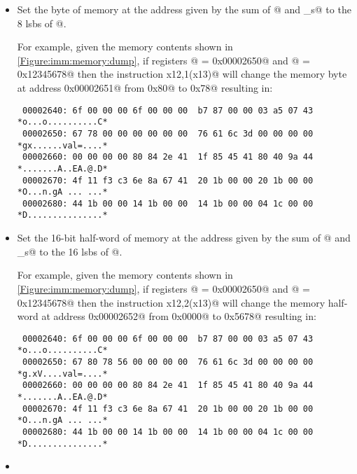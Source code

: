 \begin{itemize}
\item{}
\label{insn:sb}

Set the byte of memory at the address given by the sum of @ and 
\verb@imm_s@ to the 8 \acrshort{lsb}s of @.

For example, given the memory contents shown in \autoref{Figure:imm:memory:dump},
if registers @ = \verb@0x00002650@ and @ = \verb@0x12345678@
then the instruction \verb@sb x12,1(x13)@ will change the memory byte at address 
\verb@0x00002651@ from \verb@0x80@ to \verb@0x78@ resulting in:

\begin{verbatim}
 00002640: 6f 00 00 00 6f 00 00 00  b7 87 00 00 03 a5 07 43 *o...o..........C*
 00002650: 67 78 00 00 00 00 00 00  76 61 6c 3d 00 00 00 00 *gx......val=....*
 00002660: 00 00 00 00 80 84 2e 41  1f 85 45 41 80 40 9a 44 *.......A..EA.@.D*
 00002670: 4f 11 f3 c3 6e 8a 67 41  20 1b 00 00 20 1b 00 00 *O...n.gA ... ...*
 00002680: 44 1b 00 00 14 1b 00 00  14 1b 00 00 04 1c 00 00 *D...............*
\end{verbatim}

\item{}
\label{insn:sh}

Set the 16-bit half-word of memory at the address given by the sum of @ and 
\verb@imm_s@ to the 16 \acrshort{lsb}s of @.

For example, given the memory contents shown in \autoref{Figure:imm:memory:dump},
if registers @ = \verb@0x00002650@ and @ = \verb@0x12345678@
then the instruction \verb@sh x12,2(x13)@ will change the memory half-word at 
address \verb@0x00002652@ from \verb@0x0000@ to \verb@0x5678@ resulting in:

\begin{verbatim}
 00002640: 6f 00 00 00 6f 00 00 00  b7 87 00 00 03 a5 07 43 *o...o..........C*
 00002650: 67 80 78 56 00 00 00 00  76 61 6c 3d 00 00 00 00 *g.xV....val=....*
 00002660: 00 00 00 00 80 84 2e 41  1f 85 45 41 80 40 9a 44 *.......A..EA.@.D*
 00002670: 4f 11 f3 c3 6e 8a 67 41  20 1b 00 00 20 1b 00 00 *O...n.gA ... ...*
 00002680: 44 1b 00 00 14 1b 00 00  14 1b 00 00 04 1c 00 00 *D...............*
\end{verbatim}

\item{}
\label{insn:sw}


\end{itemize}
